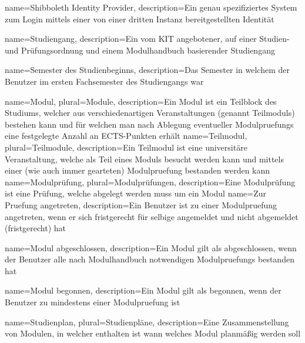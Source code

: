{
	name=Shibboleth Identity Provider,
	description={Ein genau spezifiziertes System zum Login mittels einer von einer dritten Instanz bereitgestellten Identität}
}

{
	name=Studiengang,
	description={Ein vom KIT angebotener, auf einer Studien- und Prüfungsordnung und einem Modulhandbuch basierender Studiengang}
}

{
	name=Semester des Studienbeginns,
	description={Das Semester in welchem der \gls{Benutzer} im ersten Fachsemester des \gls{Studiengang}s war}
}

{
	name=Modul,
	plural=Module,
	description={Ein Modul ist ein Teilblock des Studiums, welcher aus verschiedenartigen Veranstaltungen (genannt \glspl{Teilmodul}) bestehen kann und für welchen man nach Ablegung eventueller \glspl{Modulpruefung} eine festgelegte Anzahl an ECTS-Punkten erhält}
}
{
	name=Teilmodul,
	plural=Teilmodule,
	description={Ein Teilmodul ist eine universitäre Veranstaltung, welche als Teil eines Moduls besucht werden kann und mittels einer (wie auch immer gearteten) \gls{Modulpruefung} bestanden werden kann}
}
{
	name=Modulprüfung,
	plural=Modulprüfungen,
	description={Eine Modulprüfung ist eine Prüfung, welche abgelegt werden muss um ein Modul }
}
{
	name=Zur Pruefung angetreten,
	description={Ein \gls{Benutzer} ist zu einer \gls{Modulpruefung} angetreten, wenn er sich fristgerecht für selbige angemeldet und nicht abgemeldet (fristgerecht) hat}
}

{
	name=Modul abgeschlossen,
	description={Ein \gls{Modul} gilt als abgeschlossen, wenn der \gls{Benutzer} alle nach Modulhandbuch notwendigen \glspl{Modulpruefung} bestanden hat}
}

{
	name=Modul begonnen,
	description={Ein \gls{Modul} gilt als begonnen, wenn der \gls{Benutzer} zu mindestens einer \gls{Modulpruefung}  ist}
}

{
	name=Studienplan,
	plural=Studienpläne,
	description={Eine Zusammenstellung von Modulen, in welcher enthalten ist wann welches Modul planmäßig  werden soll}
}
